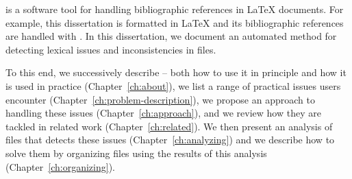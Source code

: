 
\noindent
{\bibtex} is a software tool for handling bibliographic
references in {\LaTeX} documents.  For example, this dissertation is
formatted in {\LaTeX} and its bibliographic references are handled
with {\bibtex}.  In this dissertation, we document an automated method for
detecting lexical issues and inconsistencies in {\bibtex} files.

To this end, we successively describe {\bibtex} -- both how to use it
in principle and how it is used in practice (Chapter~\ref{ch:about}),
we list a range of practical issues {\bibtex} users encounter
(Chapter~\ref{ch:problem-description}), we propose an approach to
hand\-ling these issues (Chapter~\ref{ch:approach}), and we review how
they are tackled in related work (Chapter~\ref{ch:related}).  We then
present an analysis of {\bibtex} files that detects these issues
(Chapter~\ref{ch:analyzing}) and we describe how to solve them by
organizing {\bibtex} files using the results of this analysis
(Chapter~\ref{ch:organizing}).